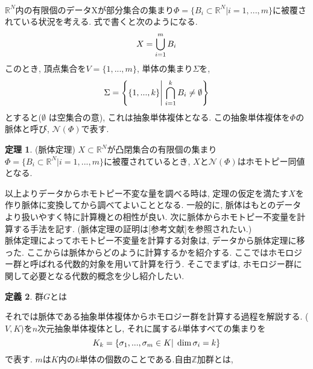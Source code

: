 \documentclass[a4paper]{jsarticle}
\theoremstyle{definition}
\newtheorem{dfn}{定義}[section]
\newtheorem{thm}[dfn]{定理}
\begin{document}
\noindent\\
$\mathbb{R}^N$内の有限個のデータXが部分集合の集まり$\Phi=\{B_i\subset \mathbb{R}^N| 
 i=1,...,m\}$に被覆されている状況を考える. 式で書くと次のようになる.
 \begin{equation}
     X = \bigcup_{i=1}^{m}B_i \notag
 \end{equation}
このとき, 頂点集合を$V=\{1,...,m\}$, 単体の集まり$\Sigma$を, 
\begin{equation}
   \Sigma = \left\{ \{1,...,k\} \middle| \; \bigcap_{i=1}^{k}B_{i} \neq \emptyset \right\} 
 \notag
 \end{equation}
とすると($\emptyset$ は空集合の意), これは抽象単体複体となる. この抽象単体複体を$\Phi$の脈体と呼び, $\mathcal{N}(\Phi)$で表す. 
\begin{thm}
    (脈体定理) $X\subset \mathbb{R}^N$が凸閉集合の有限個の集まり$\Phi=\{B_i\subset \mathbb{R}^N| i=1,...,m\}$に被覆されているとき, $X$と$\mathcal{N}(\Phi)$はホモトピー同値となる.
\end{thm}
以上よりデータからホモトピー不変な量を調べる時は, 定理の仮定を満たす$X$を作り脈体に変換してから調べてよいこととなる. 一般的に, 脈体はもとのデータより扱いやすく特に計算機との相性が良い. 次に脈体からホモトピー不変量を計算する手法を記す. (脈体定理の証明は[参考文献]を参照されたい.) \\

脈体定理によってホモトピー不変量を計算する対象は, データから脈体定理に移った. ここからは脈体からどのように計算するかを紹介する. ここではホモロジー群と呼ばれる代数的対象を用いて計算を行う. そこでまずは, ホモロジー群に関して必要となる代数的概念を少し紹介したい.
\begin{dfn}
    群$G$とは
\end{dfn}









それでは脈体である抽象単体複体からホモロジー群を計算する過程を解説する.
($V,K$)を$n$次元抽象単体複体とし, それに属する$k$単体すべての集まりを
\begin{equation}
    K_k=\{\sigma_1,...,\sigma_m\in K | \; \dim\sigma_i=k \}\notag
\end{equation}
で表す. $m$は$K$内の$k$単体の個数のことである.自由$\mathbb{Z}$加群とは, 
\end{document}
